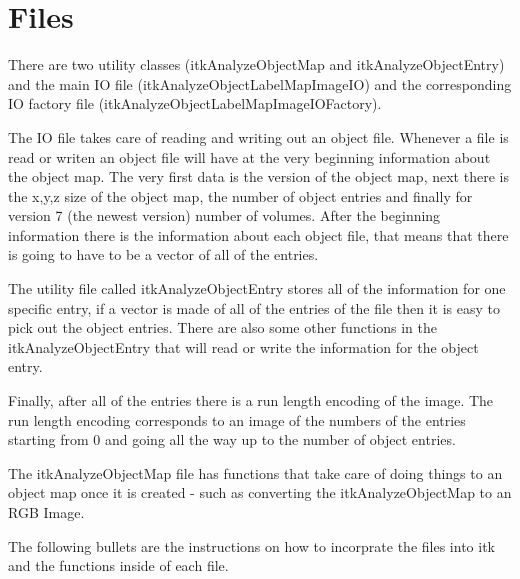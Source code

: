 \documentclass{InsightArticle}
\begin{document}
\section{Files}
There are two utility classes (itkAnalyzeObjectMap and itkAnalyzeObjectEntry) and the main IO file (itkAnalyzeObjectLabelMapImageIO) and the corresponding
IO factory file (itkAnalyzeObjectLabelMapImageIOFactory).

The IO file takes care of reading and writing out an object file.  Whenever
a file is read or writen an object file will have at the very beginning information about the object map.  The very first data is the version
of the object map, next there is the x,y,z size of the object map, the number of object entries and finally for version 7 (the newest
version) number of volumes.  After the beginning information there is the information about each object file, that means that
there is going to have to be a vector of all of the entries.  

The utility file called itkAnalyzeObjectEntry stores all of the
information for one specific entry, if a vector is made of all of the entries of the file then it is easy to pick out the object entries.  There
are also some other functions in the itkAnalyzeObjectEntry that will read or write the information for the object entry.  

Finally, after all of the entries there is a run length encoding of the image.  The run length encoding corresponds to an image of the numbers of the entries starting from 0 and going all the way up to the number of object entries.  

The itkAnalyzeObjectMap file has functions that take care of doing things to an object map once it is created - such as converting the itkAnalyzeObjectMap to an RGB Image. 

The following bullets are the instructions on how to incorprate the files into itk and the functions inside of each file.
\end{document}
